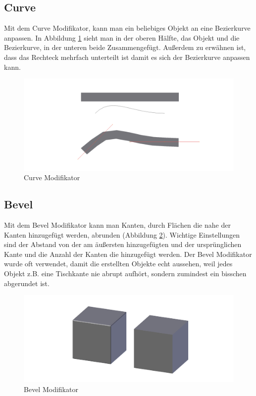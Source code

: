 \subsection{Curve}\citep{blender:curve_modifier}
\label{Curve:heading}
Mit dem Curve Modifikator, kann man ein beliebiges Objekt an eine Bezierkurve anpassen. In Abbildung \ref{modifikatoren:image4} sieht man
in der oberen Hälfte, das Objekt und die Bezierkurve, in der unteren beide Zusammengefügt.
Außerdem zu erwähnen ist, dass das Rechteck mehrfach unterteilt ist damit es sich der Bezierkurve anpassen kann.
\begin{figure}[h]
    \centering
    \includegraphics[width=.8\textwidth]{images/Modifikatoren-Curve.png}
    \caption{Curve Modifikator}
    \label{modifikatoren:image4}
\end{figure}

\subsection{Bevel}\citep{blender:bevel_modifier}
\label{Bevel:heading}
Mit dem Bevel Modifikator kann man Kanten, durch Flächen die nahe der Kanten hinzugefügt werden, abrunden (Abbildung \ref{modifikatoren:image5}).
Wichtige Einstellungen sind der Abstand von der am äußersten hinzugefügten und der ursprünglichen Kante und die Anzahl der Kanten die hinzugefügt werden.
Der Bevel Modifikator wurde oft verwendet, damit die erstellten Objekte echt aussehen, weil jedes Objekt z.B. eine Tischkante nie abrupt
aufhört, sondern zumindest ein bisschen abgerundet ist.
\begin{figure}[h]
    \centering
    \includegraphics[width=.8\textwidth]{images/Modifikatoren-Bevel.png}
    \caption{Bevel Modifikator}
    \label{modifikatoren:image5}
\end{figure}


